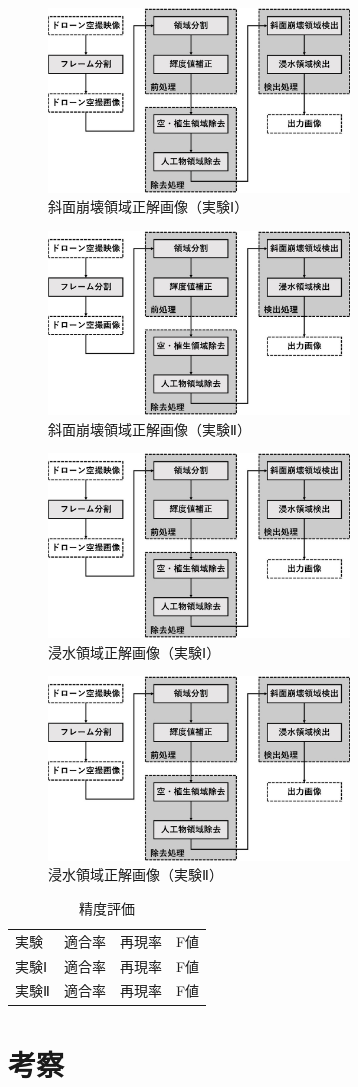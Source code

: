 \documentclass[../Thesis]{subfiles}
\begin{document}
\begin{figure}[h]
	\centering
	\includegraphics[width=8cm]{img/howto3.jpg}
	\caption{斜面崩壊領域正解画像（実験Ⅰ）}
	\label{img05}
\end{figure}
\begin{figure}[h]
	\centering
	\includegraphics[width=8cm]{img/howto3.jpg}
	\caption{斜面崩壊領域正解画像（実験Ⅱ）}
	\label{img06}
\end{figure}

\begin{figure}[h]
	\centering
	\includegraphics[width=8cm]{img/howto3.jpg}
	\caption{浸水領域正解画像（実験Ⅰ）}
	\label{img05}
\end{figure}
\begin{figure}[h]
	\centering
	\includegraphics[width=8cm]{img/howto3.jpg}
	\caption{浸水領域正解画像（実験Ⅱ）}
	\label{img06}
\end{figure}

\begin{table}[h]
	\centering
	\caption{精度評価}
	\label{tab04}
	\begin{tabular}{l l l l}
		\hline
		実験 & 適合率 & 再現率 & F値 \\
		実験Ⅰ & 適合率 & 再現率 & F値 \\
		実験Ⅱ & 適合率 & 再現率 & F値 \\
		\hline
	\end{tabular}
\end{table}


\section{考察}
\end{document}
